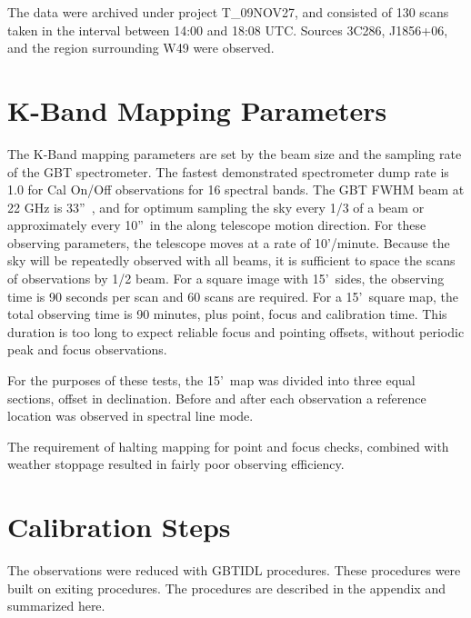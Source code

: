 \documentclass[12pt,twoside]{article}
\newcommand{\arcs}{''~}
\newcommand{\arcm}{'~}
\begin{document}
The data were archived under project T\_09NOV27, and consisted of 130 scans
taken in the interval between 14:00 and 18:08 UTC.   Sources 3C286, J1856+06,
and the region surrounding W49 were observed.
 
\section[K-Band Mapping Parameters]{K-Band Mapping Parameters}
\bigskip

The K-Band mapping parameters are set by the beam size and the
sampling rate of the GBT spectrometer.   The fastest demonstrated
spectrometer dump rate is 1.0 for Cal On/Off observations for 16 spectral
bands.    The GBT FWHM beam at 22 GHz is 33\arcs, and for optimum sampling
the sky every 1/3 of a beam or approximately every 10\arcs in the along
telescope motion direction.
For these observing parameters, the telescope moves at a rate of 10'/minute.
Because the sky will be repeatedly observed with all beams, it is sufficient
to space the scans of observations by 1/2 beam.    
For a square image with 15\arcm sides, the observing time is 90 seconds
per scan and 60 scans are required.   For a 15\arcm square map, the total observing time is 90 minutes, plus point, focus and calibration time.   This duration is too long to expect
reliable focus and pointing offsets, without periodic peak and focus observations.

For the purposes of these tests, the 15\arcm map was divided into three
equal sections, offset in declination.   Before and after each observation a
reference location was observed in spectral line mode.

The requirement of halting mapping for point and focus checks, combined
with weather stoppage resulted in fairly poor observing efficiency.   


\section{Calibration Steps}

The observations were reduced with GBTIDL procedures.   These procedures were
built on exiting procedures.   The procedures are described in the appendix and 
summarized here.
\end{document}
